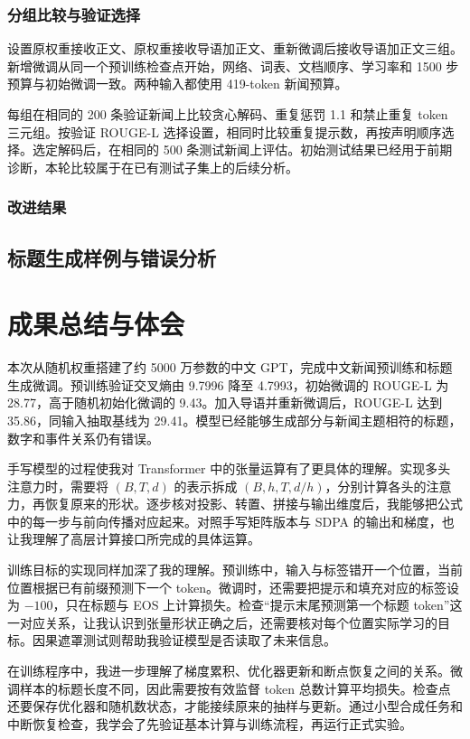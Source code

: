 \documentclass[UTF8,a4paper,12pt,fontset=fandol]{ctexart}
\begin{document}
\subsubsection{分组比较与验证选择}
设置原权重接收正文、原权重接收导语加正文、重新微调后接收导语加正文三组。新增微调从同一个预训练检查点开始，网络、词表、文档顺序、学习率和 1500 步预算与初始微调一致。两种输入都使用 419-token 新闻预算。

每组在相同的 200 条验证新闻上比较贪心解码、重复惩罚 1.1 和禁止重复 token 三元组。按验证 ROUGE-L 选择设置，相同时比较重复提示数，再按声明顺序选择。选定解码后，在相同的 500 条测试新闻上评估。初始测试结果已经用于前期诊断，本轮比较属于在已有测试子集上的后续分析。

\subsubsection{改进结果}


\subsection{标题生成样例与错误分析}


\FloatBarrier
\section{成果总结与体会}
本次从随机权重搭建了约 5000 万参数的中文 GPT，完成中文新闻预训练和标题生成微调。预训练验证交叉熵由 9.7996 降至 4.7993，初始微调的 ROUGE-L 为 28.77，高于随机初始化微调的 9.43。加入导语并重新微调后，ROUGE-L 达到 35.86，同输入抽取基线为 29.41。模型已经能够生成部分与新闻主题相符的标题，数字和事件关系仍有错误。

手写模型的过程使我对 Transformer 中的张量运算有了更具体的理解。实现多头注意力时，需要将 $(B,T,d)$ 的表示拆成 $(B,h,T,d/h)$，分别计算各头的注意力，再恢复原来的形状。逐步核对投影、转置、拼接与输出维度后，我能够把公式中的每一步与前向传播对应起来。对照手写矩阵版本与 SDPA 的输出和梯度，也让我理解了高层计算接口所完成的具体运算。

训练目标的实现同样加深了我的理解。预训练中，输入与标签错开一个位置，当前位置根据已有前缀预测下一个 token。微调时，还需要把提示和填充对应的标签设为 $-100$，只在标题与 EOS 上计算损失。检查“提示末尾预测第一个标题 token”这一对应关系，让我认识到张量形状正确之后，还需要核对每个位置实际学习的目标。因果遮罩测试则帮助我验证模型是否读取了未来信息。

在训练程序中，我进一步理解了梯度累积、优化器更新和断点恢复之间的关系。微调样本的标题长度不同，因此需要按有效监督 token 总数计算平均损失。检查点还要保存优化器和随机数状态，才能接续原来的抽样与更新。通过小型合成任务和中断恢复检查，我学会了先验证基本计算与训练流程，再运行正式实验。
\end{document}
